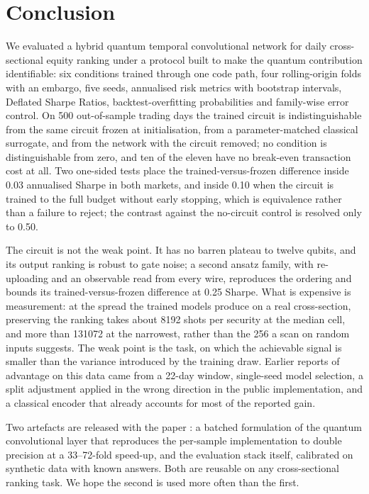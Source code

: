 \section{Conclusion}
\label{sec:conclusion}

We evaluated a hybrid quantum temporal convolutional network for daily
cross-sectional equity ranking under a protocol built to make the quantum
contribution identifiable: six conditions trained through one code path, four rolling-origin folds with an embargo, five seeds, annualised risk
metrics with bootstrap intervals, Deflated Sharpe Ratios, backtest-overfitting
probabilities and family-wise error control. On \num{500} out-of-sample
trading days the trained circuit is indistinguishable from the same circuit
frozen at initialisation, from a parameter-matched classical surrogate, and
from the network with the circuit removed; no condition is distinguishable from
zero, and ten of the eleven have no break-even transaction cost at all. Two
one-sided tests place the trained-versus-frozen difference inside \num{0.03}
annualised Sharpe in both markets, and inside \num{0.10} when the circuit is
trained to the full budget without early stopping, which is equivalence rather than a failure
to reject; the contrast against the no-circuit control is resolved only to
\num{0.50}.

The circuit is not the weak point. It has no barren plateau to twelve qubits,
and its output ranking is robust to gate noise; a second ansatz family, with
re-uploading and an observable read from every wire, reproduces the ordering and bounds its
trained-versus-frozen difference at \num{0.25} Sharpe. What is
expensive is measurement: at the spread the trained models produce on a real
cross-section, preserving the ranking takes about \num{8192} shots per
security at the median cell, and more than \num{131072} at the narrowest,
rather than the \num{256} a scan on random inputs suggests. The weak point is the task, on which the achievable signal is
smaller than the variance introduced by the training draw. Earlier reports of
advantage on this data came from a 22-day window, single-seed model selection,
a split adjustment applied in the wrong direction in the public implementation,
and a classical encoder that already accounts for most of the reported gain.

Two artefacts are released with the paper \citep{chen2026repo}: a batched formulation of the quantum
convolutional layer that reproduces the per-sample implementation to
double precision at a \numrange{33}{72}-fold speed-up, and the evaluation stack itself,
calibrated on synthetic data with known answers. Both are reusable on any
cross-sectional ranking task. We hope the second is used more often than the
first.
